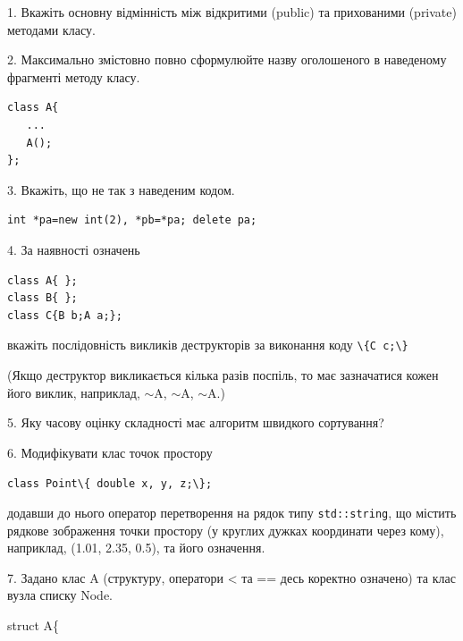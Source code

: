 \documentclass[12pt, ukrainian]{article}
\def\code#1{\Verb!#1!}
\begin{document}
{%
1. Вкажіть основну відмінність між відкритими (public) та прихованими (private) методами класу.%
\par
\vspace{2mm}
2. Максимально змістовно повно сформулюйте назву оголошеного в наведеному фрагменті методу класу.
\vspace{-3mm}
\begin{verbatim}class A{
   ...
   A();
};\end{verbatim}
\vspace{-3mm}
\par
\vspace{2mm}
3. Вкажіть, що не так з наведеним кодом.
\vspace{-3mm}
\begin{verbatim}int *pa=new int(2), *pb=*pa; delete pa;\end{verbatim}
\vspace{-3mm}
\par
\vspace{2mm}
4. За наявності означень
\vspace{-3mm}
\begin{verbatim}
class A{ };
class B{ };
class C{B b;A a;};\end{verbatim}
\vspace{-3mm}
вкажіть послідовність викликів деструкторів за виконання коду \code{\{C c;\}} 

(Якщо деструктор викликається кілька разів поспіль, то має зазначатися кожен його виклик, наприклад, $\sim$A, $\sim$A, $\sim$A.)

\vspace{2mm}
5. Яку часову оцінку складності має алгоритм швидкого сортування?
\par
\vspace{2mm}
6. Модифікувати клас точок простору 

\qquad\code{class Point\{ double x, y, z;\};}


додавши до нього оператор перетворення на рядок типу \code{std::string}, що містить рядкове зображення точки простору (у круглих дужках координати через кому), наприклад, (1.01, 2.35, 0.5), та його означення.%
\par
\vspace{2mm}
7. 
Задано клас A (структуру, оператори < та == десь коректно означено) та клас вузла списку Node.

struct A\{

}
\end{document}
